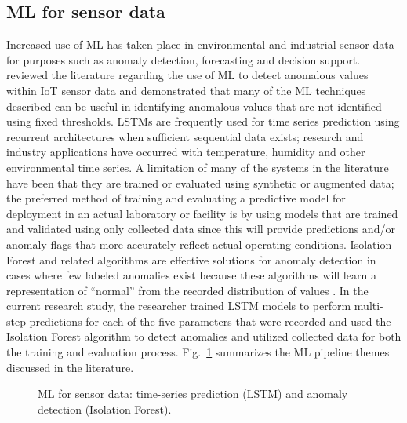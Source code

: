 \documentclass[journal,onecolumn]{IEEEtran}
\begin{document}
\subsection{ML for sensor data}
Increased use of ML has taken place in environmental and industrial sensor data for purposes such as anomaly detection, forecasting and decision support. \cite{mlanomaly2022} reviewed the literature regarding the use of ML to detect anomalous values within IoT sensor data and demonstrated that many of the ML techniques described can be useful in identifying anomalous values that are not identified using fixed thresholds. LSTMs are frequently used for time series prediction using recurrent architectures when sufficient sequential data exists; research and industry applications have occurred with temperature, humidity and other environmental time series. A limitation of many of the systems in the literature have been that they are trained or evaluated using synthetic or augmented data; the preferred method of training and evaluating a predictive model for deployment in an actual laboratory or facility is by using models that are trained and validated using only collected data since this will provide predictions and/or anomaly flags that more accurately reflect actual operating conditions. Isolation Forest and related algorithms are effective solutions for anomaly detection in cases where few labeled anomalies exist because these algorithms will learn a representation of ``normal'' from the recorded distribution of values \cite{mlanomaly2022}. In the current research study, the researcher trained LSTM models to perform multi-step predictions for each of the five parameters that were recorded and used the Isolation Forest algorithm to detect anomalies and utilized collected data for both the training and evaluation process. Fig.~\ref{fig:lit-ml} summarizes the ML pipeline themes discussed in the literature.

\begin{figure}[h]
\centering
{}
\caption{ML for sensor data: time-series prediction (LSTM) and anomaly detection (Isolation Forest).}
\label{fig:lit-ml}
\end{figure}
\end{document}
